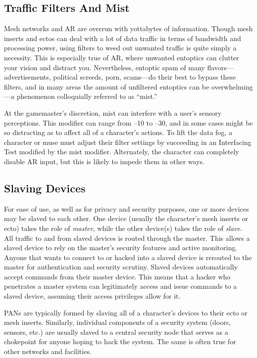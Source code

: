 \subsection{Traffic Filters And Mist}

Mesh networks and AR are overrun with yottabytes of 
information. Though mesh inserts and ectos can deal 
with a lot of data traffic in terms of bandwidth and 
processing power, using filters to weed out unwanted 
traffic is quite simply a necessity. This is especially true 
of AR, where unwanted entoptics can clutter your 
vision and distract you. Nevertheless, entoptic spam of 
many flavors—advertisements, political screeds, porn, 
scams—do their best to bypass these filters, and in 
many areas the amount of unfiltered entoptics can be 
overwhelming—a phenomenon colloquially referred 
to as ``mist.''

At the gamemaster's discretion, mist can interfere 
with a user's sensory perceptions. This modifier can 
range from –10 to –30, and in some cases might be 
so distracting as to affect all of a character's actions. 
To lift the data fog, a character or muse must adjust 
their filter settings by succeeding in an Interfacing Test 
modified by the mist modifier. Alternately, the character
can completely disable AR input, but this is likely
to impede them in other ways.

\subsection{Slaving Devices}


For ease of use, as well as for privacy and security 
purposes, one or more devices may be slaved to each 
other. One device (usually the character's mesh inserts 
or ecto) takes the role of \textit{master,} while the other 
device(s) takes the role of \textit{slave.} All traffic to and 
from slaved devices is routed through the master. This 
allows a slaved device to rely on the master's security 
features and active monitoring. Anyone that wants to 
connect to or hacked into a slaved device is rerouted 
to the master for authentication and security scrutiny.
Slaved devices automatically accept commands from 
their master device. This means that a hacker who 
penetrates a master system can legitimately access 
and issue commands to a slaved device, assuming their 
access privileges allow for it.

PANs are typically formed by slaving all of a character's
devices to their ecto or mesh inserts. Similarly,
individual components of a security system (doors, 
sensors, etc.) are usually slaved to a central security 
node that serves as a chokepoint for anyone hoping 
to hack the system. The same is often true for other 
networks and facilities.

